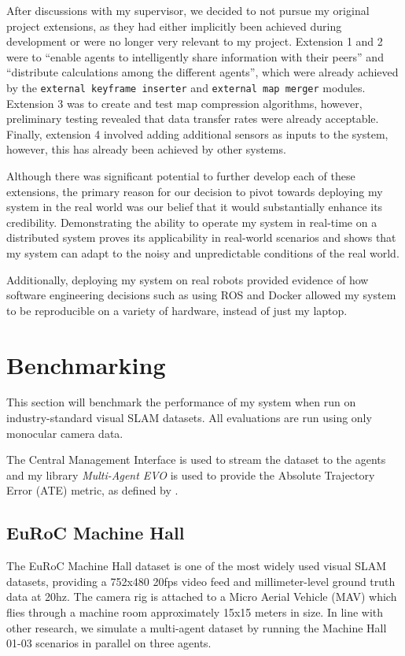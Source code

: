 After discussions with my supervisor, we decided to not pursue my original project extensions, as they had either implicitly been achieved during development or were no longer very relevant to my project. Extension 1 and 2 were to ``enable agents to intelligently share information with their peers'' and ``distribute calculations among the different agents'', which were already achieved by the \texttt{external keyframe inserter} and \texttt{external map merger} modules. Extension 3 was to create and test map compression algorithms, however, preliminary testing revealed that data transfer rates were already acceptable. Finally, extension 4 involved adding additional sensors as inputs to the system, however, this has already been achieved by other systems.

Although there was significant potential to further develop each of these extensions, the primary reason for our decision to pivot towards deploying my system in the real world was our belief that it would substantially enhance its credibility. Demonstrating the ability to operate my system in real-time on a distributed system proves its applicability in real-world scenarios and shows that my system can adapt to the noisy and unpredictable conditions of the real world.

Additionally, deploying my system on real robots provided evidence of how software engineering decisions such as using ROS and Docker allowed my system to be reproducible on a variety of hardware, instead of just my laptop.

\section{Benchmarking}
\label{sec:benchmarking}
This section will benchmark the performance of my system when run on industry-standard visual SLAM datasets. All evaluations are run using only monocular camera data.

The Central Management Interface is used to stream the dataset to the agents and my library \textit{Multi-Agent EVO} is used to provide the Absolute Trajectory Error (ATE) metric, as defined by \autocite{6385773}.

\subsection{EuRoC Machine Hall}
\label{sec:euroc-machine-hall}
The EuRoC Machine Hall dataset \autocite{burri2016euroc} is one of the most widely used visual SLAM datasets, providing a 752x480 20fps video feed and millimeter-level ground truth data at 20hz. The camera rig is attached to a Micro Aerial Vehicle (MAV) which flies through a machine room approximately 15x15 meters in size. In line with other research, we simulate a multi-agent dataset by running the Machine Hall 01-03 scenarios in parallel on three agents.

